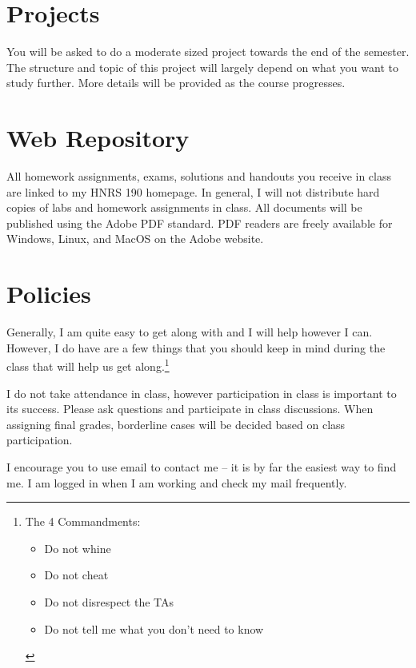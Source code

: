 \documentclass{tufte-handout}
\begin{document}
\section{Projects}

You will be asked to do a moderate sized project towards the end of
the semester.  The structure and topic of this project will largely
depend on what you want to study further.  More details will be
provided as the course progresses.

\section{Web Repository}

All homework assignments, exams, solutions and handouts you receive in
class are linked to my HNRS 190 homepage.
In general, I will not distribute hard copies of labs and homework
assignments in class.  All documents will be published using the Adobe
PDF standard.  PDF readers are freely available for Windows, Linux,
and MacOS on the Adobe website.

\section{Policies}

Generally, I am quite easy to get along with and I will help however I
can.  However, I do have are a few things that you should keep in mind
during the class that will help us get along.\footnote{The 4
  Commandments:
    \begin{itemize}
      \parskip=0pt\itemsep=0pt
    \item Do not whine
    \item Do not cheat
    \item Do not disrespect the TAs
    \item Do not tell me what you don't need to know
    \end{itemize}}

 I do not take attendance in class, however
participation in class is important to its success. Please ask
questions and participate in class discussions. When assigning final
grades, borderline cases will be decided based on class
participation. 

 I encourage you to use email to contact me -- it is
by far the easiest way to find me. I am logged in when I am working
and check my mail frequently.
\end{document}
